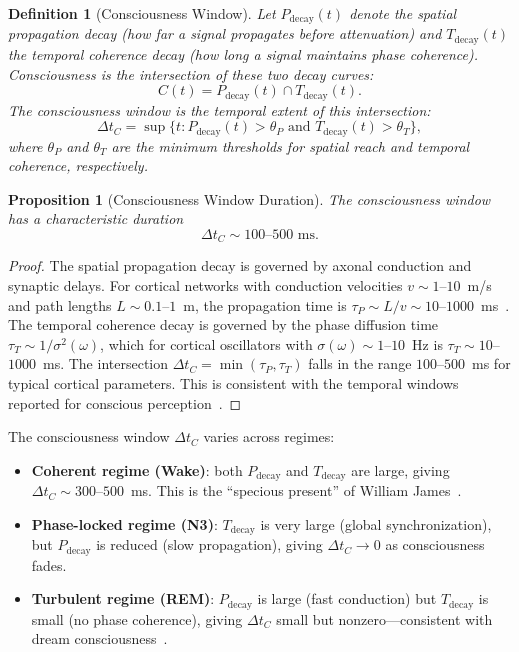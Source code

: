 \documentclass[aps,prd,twocolumn,superscriptaddress,floatfix,nofootinbib]{revtex4-2}
\newtheorem{definition}[theorem]{Definition}
\newtheorem{proposition}[theorem]{Proposition}
\theoremstyle{remark}
\newcommand{\Pdecay}{P_{\mathrm{decay}}}
\newcommand{\Tdecay}{T_{\mathrm{decay}}}
\begin{document}
\begin{definition}[Consciousness Window]
\label{def:consciousness}
Let $\Pdecay(t)$ denote the spatial propagation decay (how far a signal propagates before attenuation) and $\Tdecay(t)$ the temporal coherence decay (how long a signal maintains phase coherence). Consciousness is the intersection of these two decay curves:
\begin{equation}
    \boxed{C(t) = \Pdecay(t) \cap \Tdecay(t).}
    \label{eq:consciousness}
\end{equation}
The consciousness window is the temporal extent of this intersection:
\begin{equation}
    \Delta t_C = \sup\{t : \Pdecay(t) > \theta_P \text{ and } \Tdecay(t) > \theta_T\},
    \label{eq:consciousness_window}
\end{equation}
where $\theta_P$ and $\theta_T$ are the minimum thresholds for spatial reach and temporal coherence, respectively.
\end{definition}

\begin{proposition}[Consciousness Window Duration]
\label{prop:window}
The consciousness window has a characteristic duration
\begin{equation}
    \boxed{\Delta t_C \sim 100\text{--}500 \text{ ms}.}
    \label{eq:window_duration}
\end{equation}
\end{proposition}

\begin{proof}
The spatial propagation decay is governed by axonal conduction and synaptic delays. For cortical networks with conduction velocities $v \sim 1$--$10$~m/s and path lengths $L \sim 0.1$--$1$~m, the propagation time is $\tau_P \sim L/v \sim 10$--$1000$~ms~\cite{bullmore2009complex}. The temporal coherence decay is governed by the phase diffusion time $\tau_T \sim 1/\sigma^2(\omega)$, which for cortical oscillators with $\sigma(\omega) \sim 1$--$10$~Hz is $\tau_T \sim 10$--$1000$~ms. The intersection $\Delta t_C = \min(\tau_P, \tau_T)$ falls in the range $100$--$500$~ms for typical cortical parameters. This is consistent with the temporal windows reported for conscious perception~\cite{dehaene2011experimental,poppel1997framework}.
\end{proof}

The consciousness window $\Delta t_C$ varies across regimes:
\begin{itemize}
    \item \textbf{Coherent regime (Wake)}: both $\Pdecay$ and $\Tdecay$ are large, giving $\Delta t_C \sim 300$--$500$~ms. This is the ``specious present'' of William James~\cite{james1890principles}.
    \item \textbf{Phase-locked regime (N3)}: $\Tdecay$ is very large (global synchronization), but $\Pdecay$ is reduced (slow propagation), giving $\Delta t_C \to 0$ as consciousness fades.
    \item \textbf{Turbulent regime (REM)}: $\Pdecay$ is large (fast conduction) but $\Tdecay$ is small (no phase coherence), giving $\Delta t_C$ small but nonzero---consistent with dream consciousness~\cite{hobson2002cognitive}.
\end{itemize}
\end{document}
